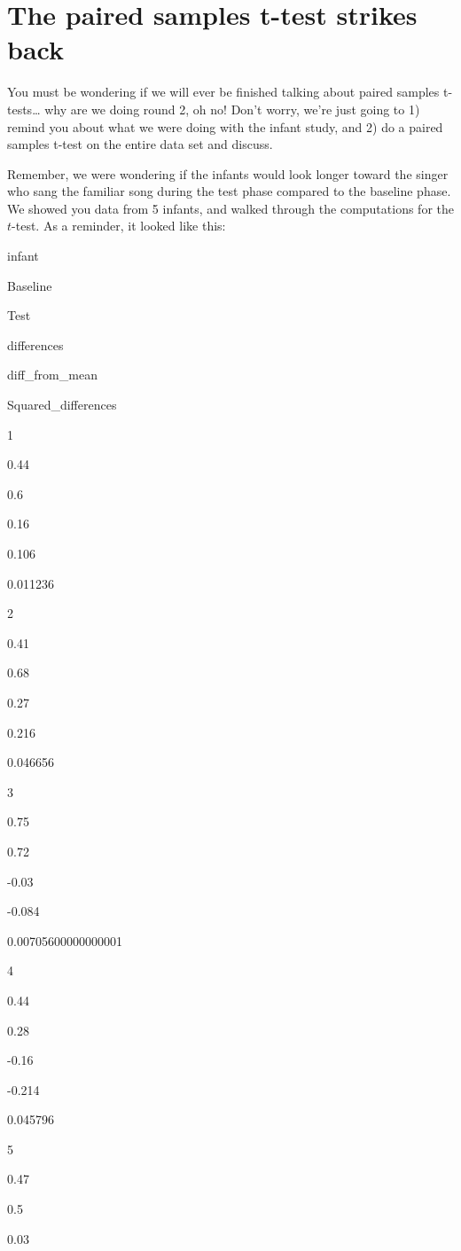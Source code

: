 \documentclass[]{book}
\begin{document}
\hypertarget{the-paired-samples-t-test-strikes-back}{%
\section{The paired samples t-test strikes back}\label{the-paired-samples-t-test-strikes-back}}

You must be wondering if we will ever be finished talking about paired samples t-tests\ldots{} why are we doing round 2, oh no! Don't worry, we're just going to 1) remind you about what we were doing with the infant study, and 2) do a paired samples t-test on the entire data set and discuss.

Remember, we were wondering if the infants would look longer toward the singer who sang the familiar song during the test phase compared to the baseline phase. We showed you data from 5 infants, and walked through the computations for the \(t\)-test. As a reminder, it looked like this:

infant

Baseline

Test

differences

diff\_from\_mean

Squared\_differences

1

0.44

0.6

0.16

0.106

0.011236

2

0.41

0.68

0.27

0.216

0.046656

3

0.75

0.72

-0.03

-0.084

0.00705600000000001

4

0.44

0.28

-0.16

-0.214

0.045796

5

0.47

0.5

0.03
\end{document}
